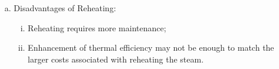 \documentclass[10pt,compress]{beamer}
\begin{document}
\begin{frame}
\begin{columns}
\begin{column}[c]{0.5\linewidth}
\begin{enumerate}[(a)]
\begin{enumerate}[(i)]
              \end{enumerate}
        \end{enumerate}
     \end{column}
     \begin{column}[c]{0.5\linewidth} 
        \begin{enumerate}[(a)]\scriptsize\setcounter{enumi}{5}
           \item<5-> Disadvantages of Reheating:
              \begin{enumerate}[(i)]\scriptsize
                 \item<5->Reheating requires more maintenance;
                 \item<5->Enhancement of thermal efficiency may not be enough to match the larger costs associated with reheating the steam.
              \end{enumerate}
        \end{enumerate}
     \end{column}
  \end{columns}
 \normalsize
\end{frame}
\end{document}
